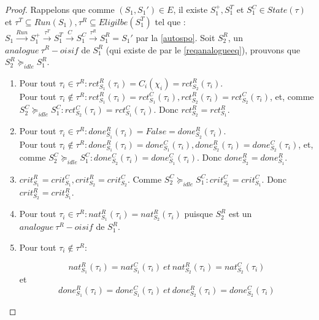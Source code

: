 \documentclass[11pt,a4paper,oneside]{book}
\theoremstyle{break}
\theoremstyle{breakplain}
\begin{document}
\begin{proof}
Rappelons que comme $(S_1, S_1') \in E$, il existe $S^{+}_1, S^{T}_1$ et $S^{C}_1 \in State(\tau)$ et $\tau^T \subseteq Run(S_1),\tau^R \subseteq Eligilbe(S^{T}_1) $ tel que : $S_1\xrightarrow{Run}S^{+}_1\xrightarrow{\tau^T}S^{T}_1\xrightarrow{C}S^{C}_1\xrightarrow{\tau^R}S_1^R=S_1'$ par la \autoref{autospo}. Soit $S_2^R$, un $analogue\ \tau^R-oisif$ de $S_1^R$ (qui existe de par le \autoref{reqanalogueeq}), prouvons que $S_2^R \succeq_{idle} S_1^R$.

\begin{enumerate}
\item Pour tout $\tau_i \in \tau^R : rct_{S_1}^R(\tau_i) = C_i(\chi_i) = rct_{S_2}^R(\tau_i)$.\\
Pour tout $\tau_i \notin \tau^R : rct_{S_1}^R(\tau_i) = rct_{S_1}^C(\tau_i), rct_{S_2}^R(\tau_i) = rct_{S_2}^C(\tau_i)$, et, comme $S^C_2 \succeq_{idle} S^C_1 : rct_{S_2}^C(\tau_i) = rct_{S_1}^C(\tau_i)$. Donc $rct_{S_2}^R = rct_{S_1}^R$.

\item \label{idle:req:done} Pour tout $\tau_i \in \tau^R : done_{S_1}^R(\tau_i) = False = done_{S_2}^R(\tau_i)$.\\
Pour tout $\tau_i \notin \tau^R : done_{S_1}^R(\tau_i) = done_{S_1}^C(\tau_i), done_{S_2}^R(\tau_i) = done_{S_2}^C(\tau_i)$, et, comme $S^C_2 \succeq_{idle} S^C_1 : done_{S_2}^C(\tau_i) = done_{S_1}^C(\tau_i)$. Donc $done_{S_2}^R = done_{S_1}^R$.

\item $crit^R_{S_1} = crit^C_{S_1}, crit^R_{S_2} = crit^C_{S_2}$. Comme $S^C_2 \succeq_{idle} S^C_1 : crit^C_{S_2} = crit^C_{S_1}$. Donc $crit^R_{S_2} = crit^R_{S_1}$.

\item Pour tout $\tau_i \in \tau^R : nat_{S_1}^R(\tau_i) = nat_{S_2}^R(\tau_i)$ puisque $S_2^R$ est un $analogue\ \tau^R-oisif$ de $S_1^R$.

\item Pour tout $\tau_i \notin \tau^R :$

\begin{equation}
\label{idle:eqidleproofnat}
nat_{S_1}^R(\tau_i) = nat_{S_1}^C(\tau_i)\ et\ nat_{S_2}^R(\tau_i) = nat_{S_2}^C(\tau_i)
\end{equation}
et 
\begin{equation}
\label{idle:eqidleproofdone}
done_{S_1}^R(\tau_i) = done_{S_1}^C(\tau_i)\ et\ done_{S_2}^R(\tau_i) = done_{S_2}^C(\tau_i)
\end{equation}

\end{enumerate}


\end{proof}
\end{document}
